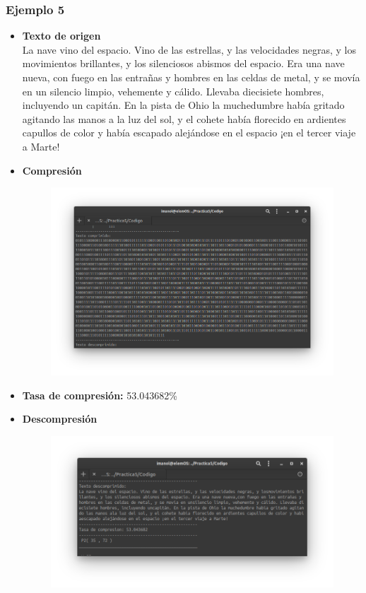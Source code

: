     \subsubsection{Ejemplo 5}
        \begin{itemize}
            \item \textbf{Texto de origen} \\
            La nave vino del espacio. Vino de las estrellas, y las velocidades negras, y los
movimientos brillantes, y los silenciosos abismos del espacio. Era una nave nueva,
con fuego en las entrañas y hombres en las celdas de metal, y se movía en un
silencio limpio, vehemente y cálido. Llevaba diecisiete hombres, incluyendo un
capitán. En la pista de Ohio la muchedumbre había gritado agitando las manos a
la luz del sol, y el cohete había florecido en ardientes capullos de color y había
escapado alejándose en el espacio ¡en el tercer viaje a Marte! 
            \item \textbf{Compresión} \\
                \begin{figure}[h!]
                    \centering
                    \includegraphics[width=17cm]{Huffman/ejemplos/ejemplo5/ej5-comp.png}
                \end{figure}
                \newpage
            \item \textbf{Tasa de compresión:} 53.043682\% \\
            \item \textbf{Descompresión} \\
                \begin{figure}[h!]
                    \centering
                    \includegraphics[width=17cm]{Huffman/ejemplos/ejemplo5/ej5-decode.png}

\end{figure}
\end{itemize}

